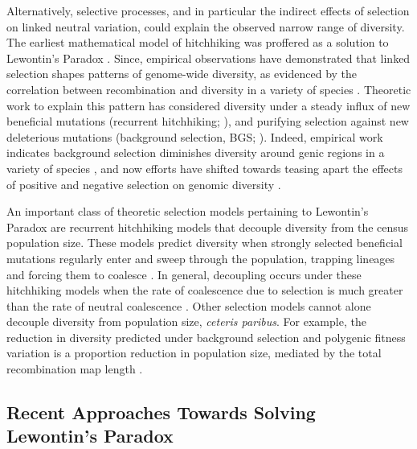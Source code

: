 \documentclass[11pt]{article}
\begin{document}
Alternatively, selective processes, and in particular the indirect effects of
selection on linked neutral variation, could explain the observed narrow range
of diversity. The earliest mathematical model of hitchhiking was proffered as a
solution to Lewontin's Paradox \parencite{Maynard_Smith1974-zr}.  Since,
empirical observations have demonstrated that linked selection shapes patterns
of genome-wide diversity, as evidenced by the correlation between recombination
and diversity in a variety of species
\parencite{Aguade1989-jx,Begun1992-ey,Cutter2003-tl,Stephan1998-hh,Cai2009-by}.
Theoretic work to explain this pattern has considered diversity under a steady
influx of new beneficial mutations (recurrent hitchhiking;
\cite{Stephan1992-jc,Stephan1995-ry}), and purifying selection against new
deleterious mutations (background selection, BGS;
\cite{Charlesworth1993-gb,Nordborg1996-nq,Hudson1994-oh,Hudson1995-xc}).
Indeed, empirical work indicates background selection diminishes diversity
around genic regions in a variety of species
\parencite{McVicker2009-ax,Hernandez2011-gs,Charlesworth1996-px}, and now
efforts have shifted towards teasing apart the effects of positive and negative
selection on genomic diversity \parencite{Elyashiv2016-vt}.

An important class of theoretic selection models pertaining to Lewontin's
Paradox are recurrent hitchhiking models that decouple diversity from the
census population size. These models predict diversity when strongly selected
beneficial mutations regularly enter and sweep through the population, trapping
lineages and forcing them to coalesce
\parencite{Kaplan1989-sc,Gillespie2000-mh}. In general, decoupling occurs under
these hitchhiking models when the rate of coalescence due to selection is much
greater than the rate of neutral coalescence \parencite[equation
22]{Coop2012-cd}. Other selection models cannot alone decouple diversity from
population size, \emph{ceteris paribus}. For example, the reduction in
diversity predicted under background selection and polygenic fitness variation
is a proportion reduction in population size, mediated by the total
recombination map length
\parencite{Charlesworth1993-gb,Nicolaisen2012-vs,Nordborg1996-nq,Robertson1961-ho,Santiago1995-hx,Santiago1998-bs}.

\subsection*{Recent Approaches Towards Solving Lewontin's Paradox}
\end{document}
